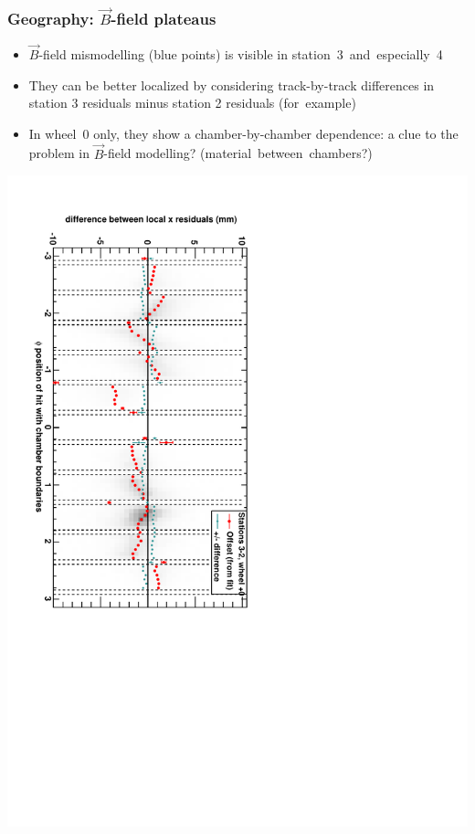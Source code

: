 \documentclass[compress]{beamer}
\begin{document}

\begin{frame}
\frametitle{Geography: $\vec{B}$-field plateaus}
\begin{itemize}
\item $\vec{B}$-field mismodelling (blue points) is visible in \mbox{station 3 and especially 4\hspace{-1 cm}}
\item They can be better localized by considering track-by-track
  differences in station 3 residuals minus station 2 residuals \mbox{(for example)\hspace{-1 cm}}
\item In wheel~0 only, they show a chamber-by-chamber dependence: a
  clue to the problem in $\vec{B}$-field modelling?  \mbox{(material between chambers?)\hspace{-1 cm}}
\end{itemize}

\begin{center}
\includegraphics[height=\linewidth, angle=90]{DTrphidiff23VsPhi_whC_slope.pdf}
\end{center}
\end{frame}
\end{document}
